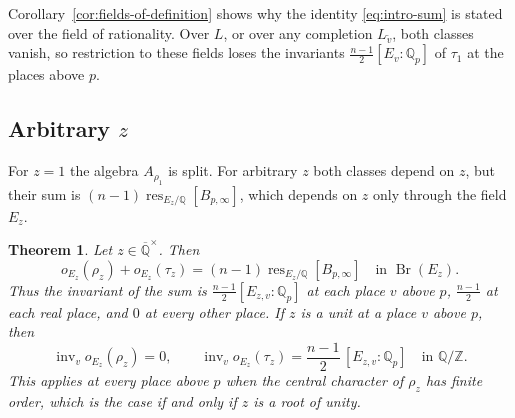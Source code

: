 \documentclass[a4paper,11pt]{amsart}
\newtheorem{theorem}{Theorem}[section]
\theoremstyle{definition}
\theoremstyle{remark}
\numberwithin{equation}{section}
\newcommand{\Q}{\mathbb{Q}}
\newcommand{\Z}{\mathbb{Z}}
\DeclareMathOperator{\Br}{Br}
\DeclareMathOperator{\inv}{inv}
\DeclareMathOperator{\res}{res}
\newcommand{\Qbar}{\overline{\mathbb{Q}}}
\begin{document}
Corollary~\ref{cor:fields-of-definition} shows why the identity \eqref{eq:intro-sum} is stated over the field of rationality. Over $L$, or over any completion $L_{\tilde v}$, both classes vanish, so restriction to these fields loses the invariants $\frac{n-1}2[E_v:\Q_p]$ of $\tau_1$ at the places above $p$.

\subsection{Arbitrary \texorpdfstring{$z$}{z}}\label{subsec:arbitrary}

For $z=1$ the algebra $A_{\rho_1}$ is split. For arbitrary $z$ both classes depend on $z$, but their sum is $(n-1)\res_{E_z/\Q}[B_{p,\infty}]$, which depends on $z$ only through the field $E_z$.

\begin{theorem}\label{thm:arbitrary-central-value}
Let $z\in\Qbar^\times$. Then
\begin{equation}\label{eq:arbitrary-central-value}
 o_{E_z}(\rho_z)+o_{E_z}(\tau_z)=(n-1)\res_{E_z/\Q}[B_{p,\infty}] \quad\text{in }\Br(E_z).
\end{equation}
Thus the invariant of the sum is $\frac{n-1}2[E_{z,v}:\Q_p]$ at each place $v$ above $p$, $\frac{n-1}2$ at each real place, and $0$ at every other place. If $z$ is a unit at a place $v$ above $p$, then
\[
 \inv_v o_{E_z}(\rho_z)=0,\qquad \inv_v o_{E_z}(\tau_z)=\frac{n-1}2\,[E_{z,v}:\Q_p]\quad\text{in }\Q/\Z.
\]
This applies at every place above $p$ when the central character of $\rho_z$ has finite order, which is the case if and only if $z$ is a root of unity.
\end{theorem}
\end{document}
